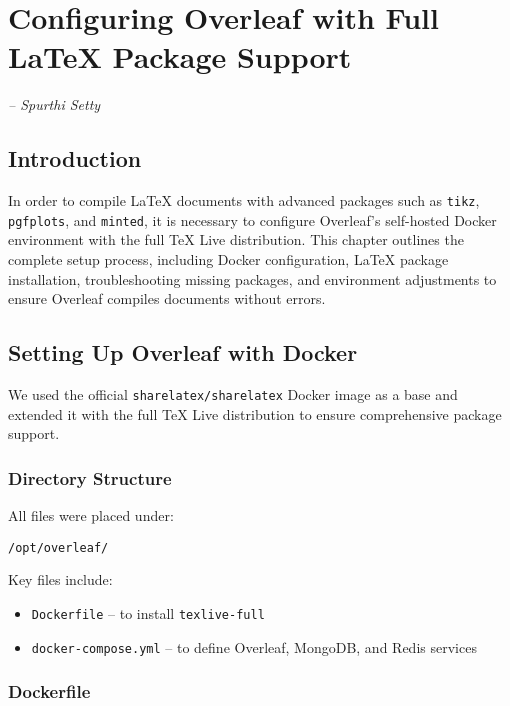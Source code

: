 \chapter{Configuring Overleaf with Full LaTeX Package Support}

\small{\textit{-- Spurthi Setty}}
\label{Chapter:OverleafConfiguration}

\section{Introduction}

In order to compile LaTeX documents with advanced packages such as \verb|tikz|, \verb|pgfplots|, and \verb|minted|, it is necessary to configure Overleaf's self-hosted Docker environment with the full \TeX{} Live distribution. This chapter outlines the complete setup process, including Docker configuration, LaTeX package installation, troubleshooting missing packages, and environment adjustments to ensure Overleaf compiles documents without errors.

\section{Setting Up Overleaf with Docker}

We used the official \verb|sharelatex/sharelatex| Docker image as a base and extended it with the full \TeX{} Live distribution to ensure comprehensive package support.

\subsection{Directory Structure}

All files were placed under:

\begin{verbatim}
/opt/overleaf/
\end{verbatim}

Key files include:

\begin{itemize}
  \item \texttt{Dockerfile} – to install \texttt{texlive-full}
  \item \texttt{docker-compose.yml} – to define Overleaf, MongoDB, and Redis services
\end{itemize}

\subsection{Dockerfile}

